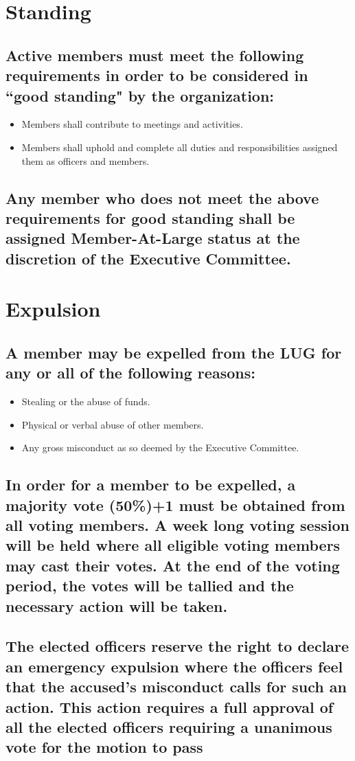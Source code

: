 \documentclass[letter]{report}
\begin{document}
\section{Standing}
\subsection{Active members must meet the following requirements in order to be considered in ``good standing" by the organization:}
\begin{itemize}
\item {Members shall contribute to meetings and activities.}
\item {Members shall uphold and complete all duties and responsibilities assigned them as officers and members.}
\end{itemize}
\subsection{Any member who does not meet the above requirements for good standing shall be assigned Member-At-Large status at the discretion of the Executive Committee.}

\section{Expulsion}
\subsection{A member may be expelled from the LUG for any or all of the following reasons:}
\begin{itemize}
	\item Stealing or the abuse of funds.
	\item Physical or verbal abuse of other members.
	\item Any gross misconduct as so deemed by the Executive Committee.
\end{itemize}
\subsection{ In order for a member to be expelled, a majority vote (50\%)+1 must be obtained from all voting members.  A week long voting session will be held where all eligible voting members may cast their votes.  At the end of the voting period, the votes will be tallied and the necessary action will be taken.}  

\subsection{The elected officers reserve the right to declare an emergency expulsion where the officers feel that the accused's misconduct calls for such an action.  This action requires a full approval of all the elected officers requiring a unanimous vote for the motion to pass }
\end{document}
